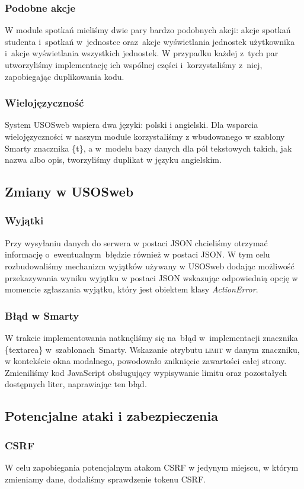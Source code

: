 \documentclass[licencjacka]{pracamgr}
\begin{document}
\subsubsection{Podobne akcje}
W module spotkań mieliśmy dwie pary bardzo podobnych akcji: akcje spotkań studenta i~spotkań w~jednostce oraz~akcje wyświetlania jednostek użytkownika i~akcje wyświetlania wszystkich jednostek. W przypadku każdej z~tych par utworzyliśmy implementację ich wspólnej części i~korzystaliśmy z~niej, zapobiegając duplikowania kodu.
\subsubsection{Wielojęzyczność}
System USOSweb wspiera dwa języki: polski i angielski. Dla wsparcia wielojęzyczności w naszym module korzystaliśmy z wbudowanego w szablony Smarty znacznika \{t\}, a w~modelu bazy danych dla pól tekstowych takich, jak nazwa albo opis, tworzyliśmy duplikat w języku angielskim.
\subsection{Zmiany w USOSweb}
\subsubsection{Wyjątki}
Przy wysyłaniu danych do serwera w postaci JSON chcieliśmy otrzymać informację o~ewentualnym~błędzie również w postaci JSON. W tym celu rozbudowaliśmy mechanizm wyjątków używany w USOSweb dodając możliwość przekazywania wyniku wyjątku w postaci JSON wskazując odpowiednią opcję w momencie zgłaszania wyjątku, który jest obiektem klasy \textsl{ActionError}.
\subsubsection{Błąd w Smarty}
W trakcie implementowania natknęliśmy się na~błąd w~implementacji znacznika \{textarea\} w~szablonach~Smarty. Wskazanie atrybutu \textsc{limit} w danym znaczniku, w kontekście okna modalnego, powodowało zniknięcie zawartości całej strony. Zmieniliśmy kod JavaScript obsługujący wypisywanie limitu oraz pozostałych dostępnych liter, naprawiając ten błąd.
\subsection{Potencjalne ataki i zabezpieczenia} \label{subsec:bezpiecz}
\subsubsection{CSRF}
W celu zapobiegania potencjalnym atakom CSRF w jedynym miejscu, w którym zmieniamy dane, dodaliśmy sprawdzenie tokenu CSRF.
\end{document}
